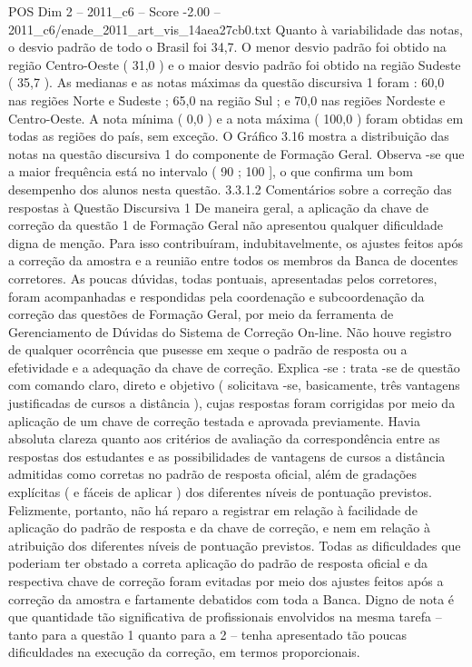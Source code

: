 \begin{textsample}{POS Dim 2 – 2011\_c6 – Score -2.00 – 2011\_c6/enade\_2011\_art\_vis\_14aea27cb0.txt}
Quanto à variabilidade das notas, o desvio padrão de todo o Brasil foi 34,7.
O menor desvio padrão foi obtido na região Centro-Oeste ( 31,0 ) e o maior desvio padrão foi obtido na região Sudeste ( 35,7 ).
As medianas e as notas máximas da questão discursiva 1 foram : 60,0 nas regiões Norte e Sudeste ; 65,0 na região Sul ; e 70,0 nas regiões Nordeste e Centro-Oeste.
A nota mínima ( 0,0 ) e a nota máxima ( 100,0 ) foram obtidas em todas as regiões do país, sem exceção.
O Gráfico 3.16 mostra a distribuição das notas na questão discursiva 1 do componente de Formação Geral.
Observa -se que a maior frequência está no intervalo ( 90 ; 100 ], o que confirma um bom desempenho dos alunos nesta questão. 3.3.1.2 Comentários sobre a correção das respostas à Questão Discursiva 1 De maneira geral, a aplicação da chave de correção da questão 1 de Formação Geral não apresentou qualquer dificuldade digna de menção.
Para isso contribuíram, indubitavelmente, os ajustes feitos após a correção da amostra e a reunião entre todos os membros da Banca de docentes corretores.
As poucas dúvidas, todas pontuais, apresentadas pelos corretores, foram acompanhadas e respondidas pela coordenação e subcoordenação da correção das questões de Formação Geral, por meio da ferramenta de Gerenciamento de Dúvidas do Sistema de Correção On-line.
Não houve registro de qualquer ocorrência que pusesse em xeque o padrão de resposta ou a efetividade e a adequação da chave de correção.
Explica -se : trata -se de questão com comando claro, direto e objetivo ( solicitava -se, basicamente, três vantagens justificadas de cursos a distância ), cujas respostas foram corrigidas por meio da aplicação de um chave de correção testada e aprovada previamente.
Havia absoluta clareza quanto aos critérios de avaliação da correspondência entre as respostas dos estudantes e as possibilidades de vantagens de cursos a distância admitidas como corretas no padrão de resposta oficial, além de gradações explícitas ( e fáceis de aplicar ) dos diferentes níveis de pontuação previstos.
Felizmente, portanto, não há reparo a registrar em relação à facilidade de aplicação do padrão de resposta e da chave de correção, e nem em relação à atribuição dos diferentes níveis de pontuação previstos.
Todas as dificuldades que poderiam ter obstado a correta aplicação do padrão de resposta oficial e da respectiva chave de correção foram evitadas por meio dos ajustes feitos após a correção da amostra e fartamente debatidos com toda a Banca.
Digno de nota é que quantidade tão significativa de profissionais envolvidos na mesma tarefa – tanto para a questão 1 quanto para a 2 – tenha apresentado tão poucas dificuldades na execução da correção, em termos proporcionais.

\end{textsample}
